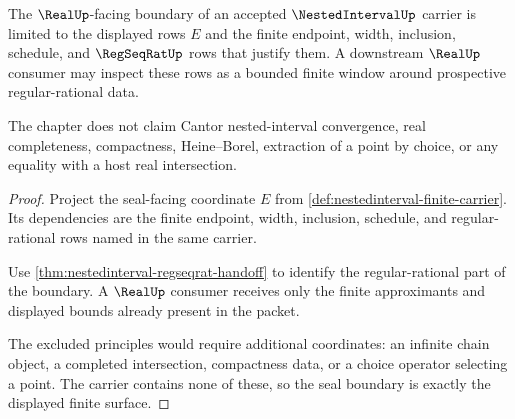 \begin{theorem}
\label{thm:nestedinterval-real-seal-boundary}
The $\RealUp$-facing boundary of an accepted $\NestedIntervalUp$ carrier is limited to the displayed rows $E$ and the finite endpoint, width, inclusion, schedule, and $\RegSeqRatUp$ rows that justify them. A downstream $\RealUp$ consumer may inspect these rows as a bounded finite window around prospective regular-rational data.

The chapter does not claim Cantor nested-interval convergence, real completeness, compactness, Heine--Borel, extraction of a point by choice, or any equality with a host real intersection.
\end{theorem}
\begin{proof}
Project the seal-facing coordinate $E$ from \autoref{def:nestedinterval-finite-carrier}. Its dependencies are the finite endpoint, width, inclusion, schedule, and regular-rational rows named in the same carrier.

Use \autoref{thm:nestedinterval-regseqrat-handoff} to identify the regular-rational part of the boundary. A $\RealUp$ consumer receives only the finite approximants and displayed bounds already present in the packet.

The excluded principles would require additional coordinates: an infinite chain object, a completed intersection, compactness data, or a choice operator selecting a point. The carrier contains none of these, so the seal boundary is exactly the displayed finite surface.
\end{proof}

